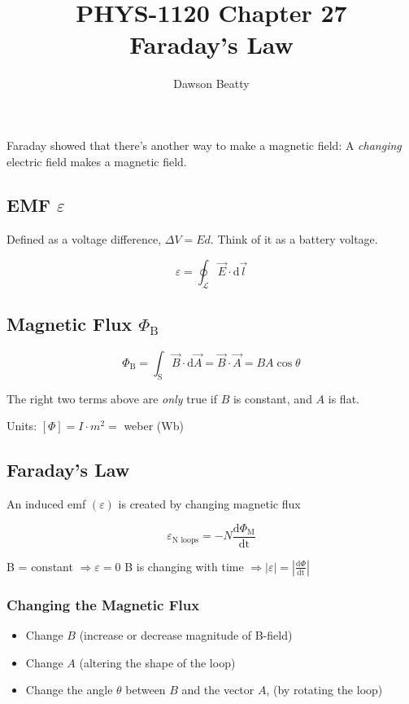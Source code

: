 \documentclass[10pt,letterpaper]{article}
\title{PHYS-1120 Chapter 27 \\ Faraday's Law}
\author{Dawson Beatty}
\begin{document}
	\maketitle
	Faraday showed that there's another way to make a magnetic field: A \textit{changing} electric field makes a magnetic field.
	
	\subsection*{EMF $\varepsilon$}
	Defined as a voltage difference, $\Delta V = Ed$.  Think of it as a battery voltage. 
	
	$$
	\boxed{\varepsilon = \oint_{\mathcal{L}} \vec{E} \cdot \text{d} \vec{\mathit{l}}}
	$$
	
	\subsection*{Magnetic Flux $\Phi_\text{B}$}
	
	$$
	\Phi_\text{B} = \int_\text{S} \vec{B} \cdot \text{d}\vec{A} = \vec{B} \cdot \vec{A} = BA \cos \theta
	$$
	
	The right two terms above are \textit{only} true if $B$ is constant, and $A$ is flat. 
	
	Units: $[\Phi] = I\cdot m^2 = $ weber (Wb)
	
	\subsection{Faraday's Law}
	An induced emf $(\varepsilon)$ is created by changing magnetic flux
	
	$$
	\boxed{\varepsilon_\text{N loops} = - N\frac{\text{d} \Phi_\text{M}}{\text{dt}}}
	$$
	
	B = constant $\Rightarrow \varepsilon = 0$
	B is changing with time $\Rightarrow |\varepsilon| = \left|\frac{\text{d}\Phi}{\text{dt}}\right|$
	
	\subsubsection*{Changing the Magnetic Flux}
	\begin{itemize}
		\item Change $B$ (increase or decrease magnitude of B-field)
		\item Change $A$ (altering the shape of the loop)
		\item Change the angle $\theta$ between $B$ and the vector $A$, (by rotating the loop)
	\end{itemize}
	
\end{document}
